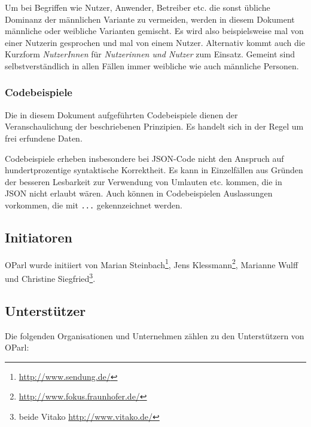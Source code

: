 \documentclass[,a4paper]{article}
\begin{document}
Um bei Begriffen wie Nutzer, Anwender, Betreiber etc. die sonst übliche
Dominanz der männlichen Variante zu vermeiden, werden in diesem Dokument
männliche oder weibliche Varianten gemischt. Es wird also beispielsweise
mal von einer Nutzerin gesprochen und mal von einem Nutzer. Alternativ
kommt auch die Kurzform \emph{NutzerInnen} für \emph{Nutzerinnen und
Nutzer} zum Einsatz. Gemeint sind selbstverständlich in allen Fällen
immer weibliche wie auch männliche Personen.

\subsubsection{Codebeispiele}\label{codebeispiele}

Die in diesem Dokument aufgeführten Codebeispiele dienen der
Veranschaulichung der beschriebenen Prinzipien. Es handelt sich in der
Regel um frei erfundene Daten.

Codebeispiele erheben insbesondere bei JSON-Code nicht den Anspruch auf
hundertprozentige syntaktische Korrektheit. Es kann in Einzelfällen aus
Gründen der besseren Lesbarkeit zur Verwendung von Umlauten etc. kommen,
die in JSON nicht erlaubt wären. Auch können in Codebeispielen
Auslassungen vorkommen, die mit \texttt{...} gekennzeichnet werden.

\subsection{Initiatoren}\label{initiatoren}

OParl wurde initiiert von Marian Steinbach\footnote{\url{http://www.sendung.de/}},
Jens Klessmann\footnote{\url{http://www.fokus.fraunhofer.de/}}, Marianne
Wulff und Christine Siegfried\footnote{beide Vitako
  \url{http://www.vitako.de/}}.

\subsection{Unterstützer}\label{unterstuxfctzer}

Die folgenden Organisationen und Unternehmen zählen zu den Unterstützern
von OParl:
\end{document}
